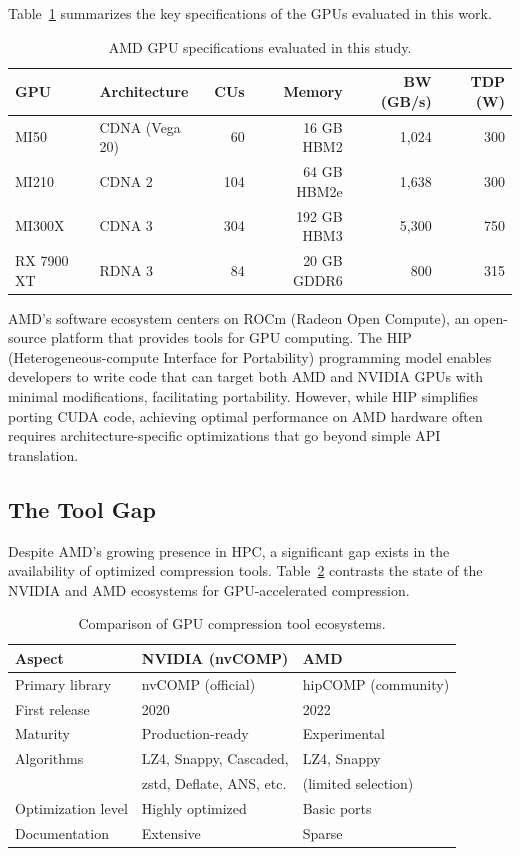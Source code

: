 \documentclass[runningheads]{llncs}
\begin{document}
Table~\ref{tab:gpu_specs} summarizes the key specifications of the GPUs evaluated in this work.

\begin{table}[t]
\centering
\caption{AMD GPU specifications evaluated in this study.}
\label{tab:gpu_specs}
\begin{tabular}{llrrrr}
\toprule
\textbf{GPU} & \textbf{Architecture} & \textbf{CUs} & \textbf{Memory} & \textbf{BW (GB/s)} & \textbf{TDP (W)} \\
\midrule
MI50 & CDNA (Vega 20) & 60 & 16 GB HBM2 & 1,024 & 300 \\
MI210 & CDNA 2 & 104 & 64 GB HBM2e & 1,638 & 300 \\
MI300X & CDNA 3 & 304 & 192 GB HBM3 & 5,300 & 750 \\
RX 7900 XT & RDNA 3 & 84 & 20 GB GDDR6 & 800 & 315 \\
\bottomrule
\end{tabular}
\end{table}

AMD's software ecosystem centers on ROCm (Radeon Open Compute), an open-source platform that provides tools for GPU computing. The HIP (Heterogeneous-compute Interface for Portability) programming model enables developers to write code that can target both AMD and NVIDIA GPUs with minimal modifications, facilitating portability. However, while HIP simplifies porting CUDA code, achieving optimal performance on AMD hardware often requires architecture-specific optimizations that go beyond simple API translation.

\subsection{The Tool Gap}
\label{sec:gap}

Despite AMD's growing presence in HPC, a significant gap exists in the availability of optimized compression tools. Table~\ref{tab:tool_gap} contrasts the state of the NVIDIA and AMD ecosystems for GPU-accelerated compression.

\begin{table}[t]
\centering
\caption{Comparison of GPU compression tool ecosystems.}
\label{tab:tool_gap}
\begin{tabular}{lll}
\toprule
\textbf{Aspect} & \textbf{NVIDIA (nvCOMP)} & \textbf{AMD} \\
\midrule
Primary library & nvCOMP (official) & hipCOMP (community) \\
First release & 2020 & 2022 \\
Maturity & Production-ready & Experimental \\
Algorithms & LZ4, Snappy, Cascaded, & LZ4, Snappy \\
 & zstd, Deflate, ANS, etc. & (limited selection) \\
Optimization level & Highly optimized & Basic ports \\
Documentation & Extensive & Sparse \\
\bottomrule
\end{tabular}
\end{table}
\end{document}
